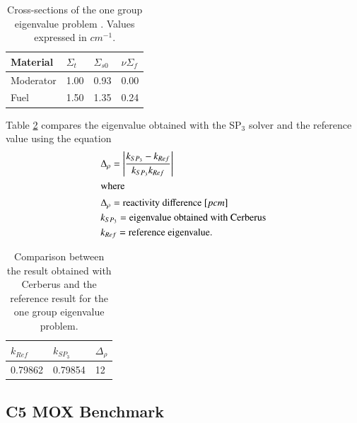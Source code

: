 \documentclass{anstrans}
\begin{document}
\begin{table}[h]
	\centering
	\caption{Cross-sections of the one group eigenvalue problem \cite{brantley_simplifiedP3_2000}. Values expressed in $cm^{-1}$.}
	\label{tab:cross-sections}
	\begin{tabular}{llll}
	\toprule
	Material	& $\Sigma_t$ & $\Sigma_{s0}$ & $\nu\Sigma_f$ \\
	\midrule
	Moderator	& 1.00		& 0.93			& 0.00			\\
	Fuel		& 1.50		& 1.35			& 0.24			\\
	\bottomrule
	\end{tabular}
\end{table}

Table \ref{tab:keff-1st} compares the eigenvalue obtained with the SP$_3$ solver and the reference value \cite{brantley_simplifiedP3_2000} using the equation
\begin{align}
  & \Delta_\rho = \left| \frac{k_{SP_3}-k_{Ref}}{k_{SP_3} k_{Ref}} \right| \label{eq:delta-rho} \\
  \intertext{where}
  & \Delta_\rho = \mbox{reactivity difference } [pcm] \notag \\
  & k_{SP_3} = \mbox{eigenvalue obtained with Cerberus} \notag \\
  & k_{Ref} = \mbox{reference eigenvalue.} \notag
\end{align}

\begin{table}[htbp!]
	\centering
	\caption{Comparison between the result obtained with Cerberus and the reference result for the one group eigenvalue problem.}
	\label{tab:keff-1st}
	\begin{tabular}{lll}
	\toprule
		$k_{Ref}$	& $k_{SP_3}$ 	& $\Delta_{\rho}$	\\
	\midrule
	 	0.79862		& 0.79854		& 12				\\
	\bottomrule
	\end{tabular}
\end{table}


\subsection{C5 MOX Benchmark}
\end{document}
